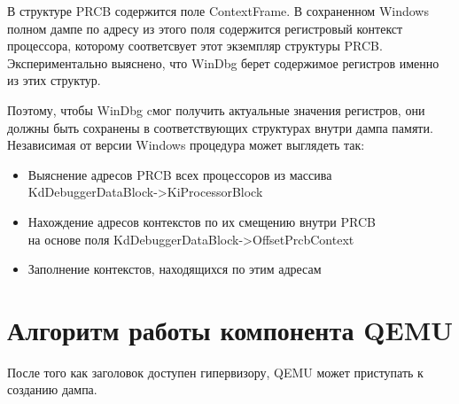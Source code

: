 \documentclass{mipt-thesis-bs}
\begin{document}
В структуре PRCB содержится поле ContextFrame. В сохраненном Windows полном дампе по адресу из этого поля содержится регистровый контекст процессора, которому соответсвует этот экземпляр структуры PRCB. Экспериментально выяснено, что WinDbg берет содержимое регистров именно из этих структур.

Поэтому, чтобы WinDbg cмог получить актуальные значения регистров, они должны быть сохранены в соответствующих структурах внутри дампа памяти. Независимая от версии Windows процедура может выглядеть так:

\begin{itemize}
\item Выяснение адресов PRCB всех процессоров из массива KdDebuggerDataBlock->KiProcessorBlock
\item Нахождение адресов контекстов по их смещению внутри PRCB\\на основе поля KdDebuggerDataBlock->OffsetPrcbContext
\item Заполнение контекстов, находящихся по этим адресам
\end{itemize}

\section*{Алгоритм работы компонента QEMU}

После того как заголовок доступен гипервизору, QEMU может приступать к созданию дампа.
\end{document}
